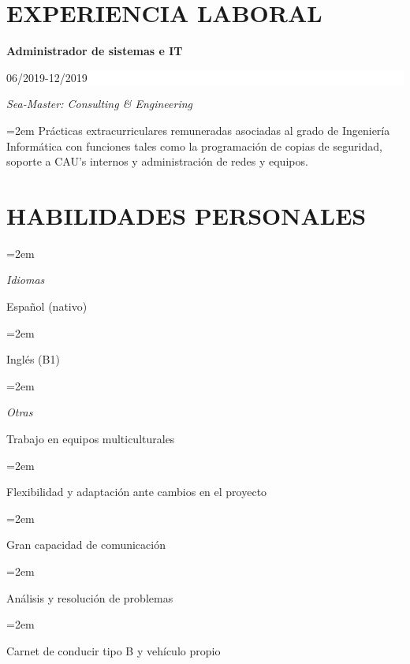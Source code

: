 \documentclass[paper=a4,fontsize=11pt]{scrartcl}
\newlength{\spacebox}
\newcommand{\sepspace}{\vspace*{1em}}		%
\newcommand{\NewPart}[1]{\section*{\uppercase{#1}}}
\newcommand{\PersonalEntry}[2]{
		\noindent\hangindent=2em\hangafter=0 %
		\parbox{\spacebox}{        %
		\textit{#1}}		       %
		\hspace{1.5em} #2 \par}    %
\newcommand{\SkillsEntry}[2]{      %
		\noindent\hangindent=2em\hangafter=0 %
		\parbox{\spacebox}{        %
		\textit{#1}}			   %
		\hspace{1.5em} #2 \par}    %
\newcommand{\EducationEntry}[4]{
		\noindent \textbf{#1} \hfill      %
		\colorbox{White}{%
			\parbox{5cm}{%
			\hfill\color{Black}#2}} \par  %
		\noindent \textit{#3} \par        %
		\noindent\hangindent=2em\hangafter=0 \small #4 %
		\normalsize \par}
\begin{document}
\NewPart{Experiencia laboral}
\EducationEntry{Administrador de sistemas e IT}{06/2019-12/2019}{Sea-Master: Consulting \& Engineering}{Prácticas extracurriculares remuneradas asociadas al grado de Ingeniería Informática con funciones tales como la programación de copias de seguridad, soporte a CAU's internos y administración de redes y equipos.}

\NewPart{Habilidades personales}{}
\SkillsEntry{Idiomas}{Español (nativo)}
\SkillsEntry{}{Inglés (B1)}

\sepspace

\SkillsEntry{Otras}{Trabajo en equipos multiculturales}
\SkillsEntry{}{Flexibilidad y adaptación ante cambios en el proyecto}
\SkillsEntry{}{Gran capacidad de comunicación}
\SkillsEntry{}{Análisis y resolución de problemas}
\SkillsEntry{}{Carnet de conducir tipo B y vehículo propio}




\end{document}
